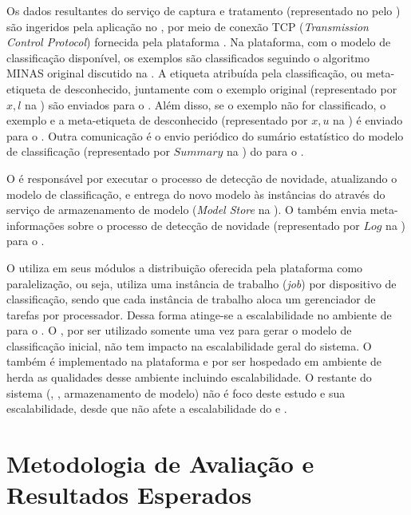 Os dados resultantes do serviço de captura e tratamento 
(representado no \mfog pelo \source)
são ingeridos pela
aplicação no \classify, por meio de conexão TCP (\emph{Transmission
Control Protocol}) fornecida pela plataforma \flink.
Na plataforma, com o modelo de classificação disponível, os exemplos são
classificados seguindo o algoritmo MINAS original discutido na .
A etiqueta atribuída pela classificação, ou meta-etiqueta de desconhecido,
juntamente com o exemplo original (representado por $x,l$ na )
são enviados para o \sink.
Além disso, se o exemplo não for classificado, o exemplo e a meta-etiqueta de
desconhecido (representado por $x,u$ na ) é enviado para o
\detector.
Outra comunicação é o envio periódico do sumário estatístico do modelo de
classificação (representado por $Summary$ na ) do \classify para o
\detector.

O \detector é responsável por executar o processo de detecção de novidade,
atualizando o modelo de classificação, e entrega do novo modelo às instâncias do
\classify através do serviço de armazenamento de modelo (\emph{Model Store} na
).
O \detector também envia meta-informações sobre o processo de detecção de
novidade (representado por $Log$ na ) para o \sink.


O \mfog utiliza em seus módulos a distribuição oferecida pela plataforma \flink
como paralelização, ou seja, utiliza uma instância de trabalho (\emph{job}) por
dispositivo de classificação, sendo que cada instância de trabalho aloca um
gerenciador de tarefas por processador.
Dessa forma atinge-se a escalabilidade no ambiente de \fog para o \classify.
O \offline, por ser utilizado somente uma vez para gerar o modelo
de classificação inicial, não tem impacto na escalabilidade geral do sistema.
O \detector também é implementado na plataforma \flink e por ser hospedado em
ambiente de \cloud herda as qualidades desse ambiente incluindo escalabilidade.
O restante do sistema (\source, \sink, armazenamento de modelo) não é foco deste
estudo e sua escalabilidade, desde que não afete a escalabilidade do \classify e
\detector.


\section{Metodologia de Avaliação e Resultados Esperados}\label{sec:esperados}

